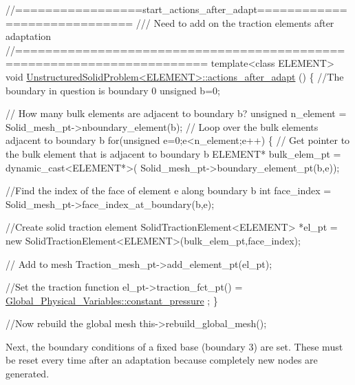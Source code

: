 \begin{DoxyCodeInclude}

\textcolor{comment}{//=================start\_actions\_after\_adapt=============================}\textcolor{comment}{}
\textcolor{comment}{ /// Need to add on the traction elements after adaptation}
\textcolor{comment}{}\textcolor{comment}{//=======================================================================}
\textcolor{keyword}{template}<\textcolor{keyword}{class} ELEMENT>
\textcolor{keywordtype}{void} \hyperlink{classUnstructuredSolidProblem_acf0bbf57534a1516a633d702d9fd21ab}{UnstructuredSolidProblem<ELEMENT>::actions\_after\_adapt}
      ()
\{
 \textcolor{comment}{//The boundary in question is boundary 0}
 \textcolor{keywordtype}{unsigned} b=0;
 
 \textcolor{comment}{// How many bulk elements are adjacent to boundary b?}
 \textcolor{keywordtype}{unsigned} n\_element = Solid\_mesh\_pt->nboundary\_element(b);
 \textcolor{comment}{// Loop over the bulk elements adjacent to boundary b}
 \textcolor{keywordflow}{for}(\textcolor{keywordtype}{unsigned} e=0;e<n\_element;e++)
  \{
   \textcolor{comment}{// Get pointer to the bulk element that is adjacent to boundary b}
   ELEMENT* bulk\_elem\_pt = \textcolor{keyword}{dynamic\_cast<}ELEMENT*\textcolor{keyword}{>}(
    Solid\_mesh\_pt->boundary\_element\_pt(b,e));
   
   \textcolor{comment}{//Find the index of the face of element e along boundary b}
   \textcolor{keywordtype}{int} face\_index = Solid\_mesh\_pt->face\_index\_at\_boundary(b,e);
   
   \textcolor{comment}{//Create solid traction element}
   SolidTractionElement<ELEMENT> *el\_pt = 
    \textcolor{keyword}{new} SolidTractionElement<ELEMENT>(bulk\_elem\_pt,face\_index);   
   
   \textcolor{comment}{// Add to mesh}
   Traction\_mesh\_pt->add\_element\_pt(el\_pt);
   
   \textcolor{comment}{//Set the traction function}
   el\_pt->traction\_fct\_pt() = \hyperlink{namespaceGlobal__Physical__Variables_a19f4e20a92e7d216b4d2b00308f96917}{Global\_Physical\_Variables::constant\_pressure}
      ;
  \}  
 
 \textcolor{comment}{//Now rebuild the global mesh}
 this->rebuild\_global\_mesh();

\end{DoxyCodeInclude}


Next, the boundary conditions of a fixed base (boundary 3) are set. These must be reset every time after an adaptation because completely new nodes are generated.



